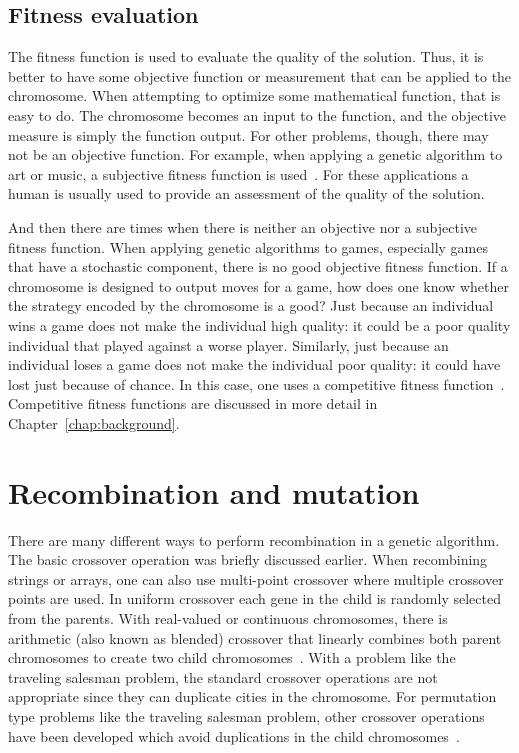 \subsection{Fitness evaluation}

The fitness function is used to evaluate the quality of the solution. Thus, it
is better to have some objective function or measurement that can be applied to
the chromosome. When attempting to optimize some mathematical function, that is
easy to do. The chromosome becomes an input to the function, and the objective
measure is simply the function output. For other problems, though, there may not
be an objective function. For example, when applying a genetic algorithm to art
or music, a subjective fitness function is used~\cite{eiben2003introduction}.
For these applications a human is usually used to provide an assessment of the
quality of the solution.

And then there are times when there is neither an objective nor a subjective
fitness function. When applying genetic algorithms to games, especially games
that have a stochastic component, there is no good objective fitness function.
If a chromosome is designed to output moves for a game, how does one know
whether the strategy encoded by the chromosome is a good? Just because an
individual wins a game does not make the individual high quality: it could be a
poor quality individual that played against a worse player. Similarly, just
because an individual loses a game does not make the individual poor quality: it
could have lost just because of chance. In this case, one uses a competitive
fitness function~\cite{fogel1999intelligence}. Competitive fitness 
functions are discussed in more detail in Chapter~\ref{chap:background}.

\section{Recombination and mutation} \label{2-recombination}

There are many different ways to perform recombination in a genetic algorithm.
The basic crossover operation was briefly discussed earlier. When recombining
strings or arrays, one can also use multi-point crossover where multiple
crossover points are used. In uniform crossover each gene in the child is
randomly selected from the parents. With real-valued or continuous chromosomes,
there is arithmetic (also known as blended) crossover that linearly combines
both parent chromosomes to create two child
chromosomes~\cite{haupt2004practical}. With a problem like the traveling
salesman problem, the standard crossover operations are not appropriate since
they can duplicate cities in the chromosome. For permutation type problems like
the traveling salesman problem, other crossover operations have been
developed which avoid duplications in the child
chromosomes~\cite{goldberg1989genetic}.
